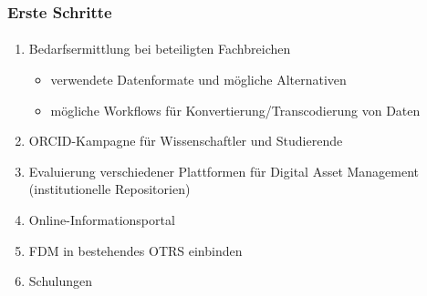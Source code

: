 \begin{frame}
    \frametitle{Erste Schritte}
    \framesubtitle{}


    \begin{enumerate}
        \item Bedarfsermittlung bei beteiligten Fachbreichen
            \begin{itemize}
                \item verwendete Datenformate und mögliche Alternativen
                \item mögliche Workflows für Konvertierung/Transcodierung von Daten
            \end{itemize}
        \item ORCID-Kampagne für Wissenschaftler und Studierende
        \item Evaluierung verschiedener Plattformen für Digital Asset Management (institutionelle Repositorien)
        \item Online-Informationsportal
        \item FDM in bestehendes OTRS einbinden
        \item Schulungen
    \end{enumerate}
\end{frame}
